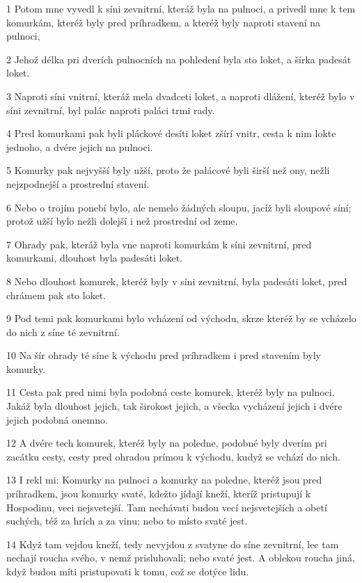 \par 1 Potom mne vyvedl k síni zevnitrní, kteráž byla na pulnoci, a privedl mne k tem komurkám, kteréž byly pred príhradkem, a kteréž byly naproti stavení na pulnoci,
\par 2 Jehož délka pri dverích pulnocních na pohledení byla sto loket, a šírka padesát loket.
\par 3 Naproti síni vnitrní, kteráž mela dvadceti loket, a naproti dlážení, kteréž bylo v síni zevnitrní, byl palác naproti paláci trmi rady.
\par 4 Pred komurkami pak byli pláckové desíti loket zšírí vnitr, cesta k nim lokte jednoho, a dvére jejich na pulnoci.
\par 5 Komurky pak nejvyšší byly užší, proto že palácové byli širší než ony, nežli nejzpodnejší a prostrední stavení.
\par 6 Nebo o trojím ponebí bylo, ale nemelo žádných sloupu, jacíž byli sloupové síní; protož užší bylo nežli dolejší i než prostrední od zeme.
\par 7 Ohrady pak, kteráž byla vne naproti komurkám k síni zevnitrní, pred komurkami, dlouhost byla padesáti loket.
\par 8 Nebo dlouhost komurek, kteréž byly v síni zevnitrní, byla padesáti loket, pred chrámem pak sto loket.
\par 9 Pod temi pak komurkami bylo vcházení od východu, skrze kteréž by se vcházelo do nich z síne té zevnitrní.
\par 10 Na šír ohrady té síne k východu pred príhradkem i pred stavením byly komurky.
\par 11 Cesta pak pred nimi byla podobná ceste komurek, kteréž byly na pulnoci. Jakáž byla dlouhost jejich, tak širokost jejich, a všecka vycházení jejich i dvére jejich podobná onemno.
\par 12 A dvére tech komurek, kteréž byly na poledne, podobné byly dverím pri zacátku cesty, cesty pred ohradou prímou k východu, kudyž se vchází do nich.
\par 13 I rekl mi: Komurky na pulnoci a komurky na poledne, kteréž jsou pred príhradkem, jsou komurky svaté, kdežto jídají kneží, kteríž pristupují k Hospodinu, veci nejsvetejší. Tam nechávati budou vecí nejsvetejších a obetí suchých, též za hrích a za vinu; nebo to místo svaté jest.
\par 14 Když tam vejdou kneží, tedy nevyjdou z svatyne do síne zevnitrní, lec tam nechají roucha svého, v nemž prisluhovali; nebo svaté jest. A oblekou roucha jiná, když budou míti pristupovati k tomu, což se dotýce lidu.
